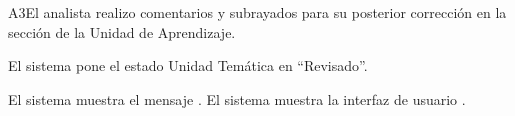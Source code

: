 	
\begin{UCtrayectoriaA}{A3}{El analista realizo comentarios y subrayados para su posterior corrección en la sección de la Unidad de Aprendizaje.} 

	\hypertarget{SP2-CU10-A3}{\UCpaso El sistema pone el estado Unidad Temática en “Revisado”.}
    \UCpaso El sistema muestra el mensaje .
    \UCpaso El sistema muestra la interfaz de usuario .
\end{UCtrayectoriaA}